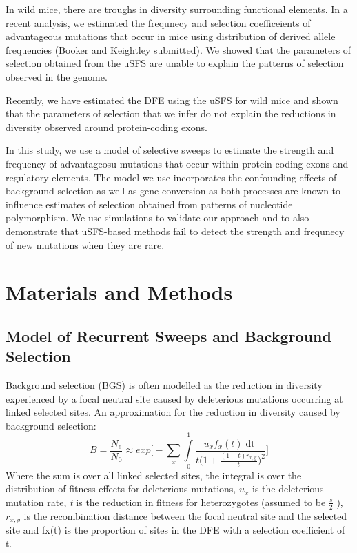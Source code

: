 \documentclass{article}
\begin{document}
In wild mice, there are troughs in diversity surrounding functional elements. In a recent analysis, we estimated the frequnecy and selection coefficeients of advantageous mutations that occur in mice using distribution of derived allele frequencies (Booker and Keightley submitted). We showed that the parameters of selection obtained from the uSFS are unable to explain the patterns of selection observed in the genome.

Recently, we have estimated the DFE using the uSFS for wild mice and shown that the parameters of selection that we infer do not explain the reductions in diversity observed around protein-coding exons. 

In this study, we use a model of selective sweeps to estimate the strength and frequency of advantageosu mutations that occur within protein-coding exons and regulatory elements. The model we use incorporates the confounding effects of background selection as well as gene conversion as both processes are known to influence estimates of selection obtained from patterns of nucleotide polymorphism. We use simulations to validate our approach and to also demonstrate that uSFS-based methods fail to detect the strength and frequnecy of new mutations when they are rare.



\section*{Materials and Methods}

	\subsection*{Model of Recurrent Sweeps and Background Selection}
Background selection (BGS) is often modelled as the reduction in diversity experienced by a focal neutral site caused by deleterious mutations occurring at linked selected sites. An approximation for the reduction in diversity caused by background selection:
\begin{equation}
B = \frac{N_{e}}{N_{0}} \approx exp\Bigg[- \sum \limits_{x} \int \limits_{0}^1 \frac{u_{x}f_x(t)\mathop{dt}}{t \Big( 1 + \frac{(1-t)r_{x,y}}{t} \Big)^2} \Bigg]
\end{equation}
Where the sum is over all linked selected sites, the integral is over the distribution of fitness effects for deleterious mutations, \emph{$u_{x}$} is the deleterious mutation rate, \emph{t} is the reduction in fitness for heterozygotes (assumed to be \(\frac{s}{2}\) ), $r_{x,y}$  is the recombination distance between the focal neutral site and the selected site and fx(t) is the proportion of sites in the DFE with a selection coefficient of t.
\end{document}
